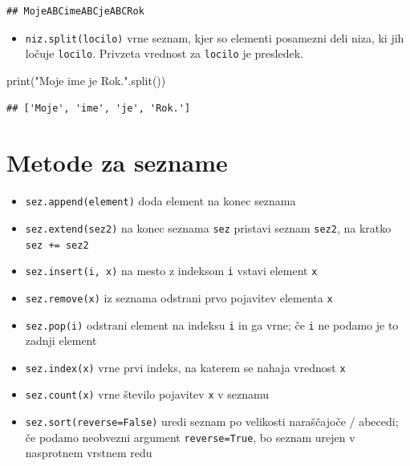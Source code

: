 \documentclass[
]{report}
\newenvironment{Shaded}{\begin{snugshade}}{\end{snugshade}}
\newcommand{\BuiltInTok}[1]{#1}
\newcommand{\NormalTok}[1]{#1}
\newcommand{\StringTok}[1]{\textcolor[rgb]{0.31,0.60,0.02}{#1}}
\providecommand{\tightlist}{%
  \setlength{\itemsep}{0pt}\setlength{\parskip}{0pt}}
\begin{document}
\begin{verbatim}
## MojeABCimeABCjeABCRok
\end{verbatim}

\begin{itemize}
\tightlist
\item
  \texttt{niz.split(locilo)} vrne seznam, kjer so elementi posamezni deli niza, ki jih
  ločuje \texttt{locilo}. Privzeta vrednost za \texttt{locilo} je presledek.
\end{itemize}

\begin{Shaded}
\begin{Highlighting}[]
\BuiltInTok{print}\NormalTok{(}\StringTok{"Moje ime je Rok."}\NormalTok{.split())}
\end{Highlighting}
\end{Shaded}

\begin{verbatim}
## ['Moje', 'ime', 'je', 'Rok.']
\end{verbatim}

\hypertarget{metode-za-sezname}{%
\section{Metode za sezname}\label{metode-za-sezname}}

\begin{itemize}
\tightlist
\item
  \texttt{sez.append(element)} doda element na konec seznama
\item
  \texttt{sez.extend(sez2)} na konec seznama \texttt{sez} pristavi seznam \texttt{sez2}, na kratko \texttt{sez\ +=\ sez2}
\item
  \texttt{sez.insert(i,\ x)} na mesto z indeksom \texttt{i} vstavi element \texttt{x}
\item
  \texttt{sez.remove(x)} iz seznama odstrani prvo pojavitev elementa \texttt{x}
\item
  \texttt{sez.pop(i)} odstrani element na indeksu \texttt{i} in ga vrne; če \texttt{i} ne podamo je to zadnji element
\item
  \texttt{sez.index(x)} vrne prvi indeks, na katerem se nahaja vrednost \texttt{x}
\item
  \texttt{sez.count(x)} vrne število pojavitev \texttt{x} v seznamu
\item
  \texttt{sez.sort(reverse=False)} uredi seznam po velikosti naraščajoče / abecedi; če podamo neobvezni argument \texttt{reverse=True}, bo seznam urejen v nasprotnem vrstnem redu
\end{itemize}
\end{document}
